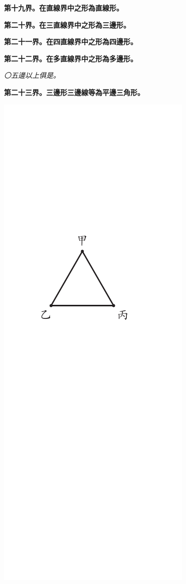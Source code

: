 \documentclass[12pt,b5paper,landscape]{article}
\newcommand{\ccom}[1]{{\footnotesize \emph{〇#1}}}
\newcommand{\cthm}[1]{{
\vspace{8pt}

\bfseries #1}}
\begin{document}
\begin{multicols}{2}
\cthm{第十九界。在直線界中之形為直線形。}

\cthm{第二十界。在三直線界中之形為三邊形。}

\cthm{第二十一界。在四直線界中之形為四邊形。}

\cthm{第二十二界。在多直線界中之形為多邊形。}\ccom{五邊以上俱是。}

\cthm{第二十三界。三邊形三邊線等為平邊三角形。}
\begin{center}
\includegraphics[angle=90]{eu14}
\end{center}


\end{multicols}
\end{document}

